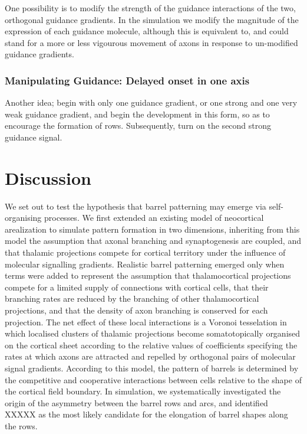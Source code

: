 \documentclass[a4paper,11pt]{article}
\newcommand{\mb}[1]{\mathbf{#1}}
\begin{document}
One possibility is to modify the strength of the guidance interactions of the
two, orthogonal guidance gradients. In the simulation we modify the magnitude
of the expression of each guidance molecule, although this is equivalent to,
and could stand for a more or less vigourous movement of axons in response to
un-modified guidance gradients.

\subsubsection*{Manipulating Guidance: Delayed onset in one axis}

Another idea; begin with only one guidance gradient, or one strong and
one very weak guidance gradient, and begin the development in this
form, so as to encourage the formation of rows. Subsequently, turn on
the second strong guidance signal.






\section*{Discussion}

We set out to test the hypothesis that barrel patterning may emerge via
self-organising processes. We first extended an existing model of neocortical
arealization to simulate pattern formation in two dimensions, inheriting from
this model the assumption that axonal branching and synaptogenesis are
coupled, and that thalamic projections compete for cortical territory under
the influence of molecular signalling gradients. Realistic barrel patterning
emerged only when terms were added to represent the assumption that
thalamocortical projections compete for a limited supply of connections with
cortical cells, that their branching rates are reduced by the branching of
other thalamocortical projections, and that the density of axon branching is
conserved for each projection. The net effect of these local interactions is a
Voronoi tesselation in which localised clusters of thalamic projections become
somatotopically organised on the cortical sheet according to the relative
values of coefficients specifying the rates at which axons are attracted and
repelled by orthogonal pairs of molecular signal gradients. According to this
model, the pattern of barrels is determined by the competitive and cooperative
interactions between cells relative to the shape of the cortical field
boundary. In simulation, we systematically investigated the origin of the
asymmetry between the barrel rows and arcs, and identified {\color{red} XXXXX}
as the most likely candidate for the elongation of barrel shapes along the
rows.


\end{document}
